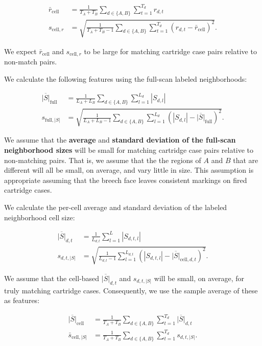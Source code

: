 \documentclass[11pt,]{isuthesis}
\begin{document}
\begin{align*}
\bar{r}_{\text{cell}} &= \frac{1}{T_A + T_B} \sum_{d \in \{A,B\}} \sum_{t = 1}^{T_d} r_{d,t} \\
s_{\text{cell}, r} &= \sqrt{\frac{1}{T_A + T_B - 1} \sum_{d \in \{A,B\}} \sum_{t = 1}^{T_d} (r_{d,t} - \bar{r}_{\text{cell}})^2}.
\end{align*}

We expect \(\bar{r}_{\text{cell}}\) and \(s_{\text{cell}, r}\) to be large for matching cartridge case pairs relative to non-match pairs.

We calculate the following features using the full-scan labeled neighborhoods:

\begin{align*}
\overline{|S|}_{\text{full}} &= \frac{1}{L_A + L_B} \sum_{d \in \{A,B\}} \sum_{l=1}^{L_d} |S_{d,l}| \\
s_{\text{full},|S|} &= \sqrt{\frac{1}{L_A + L_B - 1} \sum_{d \in \{A,B\}} \sum_{l=1}^{L_d} (|S_{d,l}| - \overline{|S|}_{\text{full}})^2}.
\end{align*}

We assume that the \textbf{average} and \textbf{standard deviation of the full-scan neighborhood sizes} will be small for matching cartridge case pairs relative to non-matching pairs.
That is, we assume that the the regions of \(A\) and \(B\) that are different will all be small, on average, and vary little in size.
This assumption is appropriate assuming that the breech face leaves consistent markings on fired cartridge cases.

We calculate the per-cell average and standard deviation of the labeled neighborhood cell size:

\begin{align*}
\overline{|S|}_{d,t} &= \frac{1}{L_{d,t}} \sum_{l=1}^L |S_{d,t,l}| \\
s_{d,t,|S|} &= \sqrt{\frac{1}{L_{d,t} - 1} \sum_{l=1}^{L_{d,t}} (|S_{d,t,l}| - \overline{|S|}_{\text{cell},d,t})^2}.
\end{align*}

We assume that the cell-based \(\overline{|S|}_{d,t}\) and \(s_{d,t,|S|}\) will be small, on average, for truly matching cartridge cases.
Consequently, we use the sample average of these as features:

\begin{align*}
\overline{|S|}_{\text{cell}} &= \frac{1}{T_A + T_B} \sum_{d \in \{A,B\}} \sum_{t=1}^{T_d} \overline{|S|}_{d,t} \\
\bar{s}_{\text{cell},|S|} &= \frac{1}{T_A + T_B} \sum_{d \in \{A,B\}} \sum_{t=1}^{T_d} s_{d,t,|S|}.
\end{align*}
\end{document}
